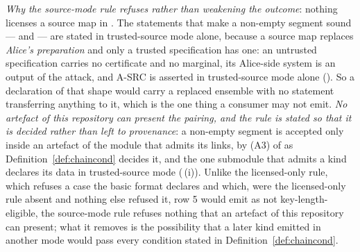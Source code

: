 \begin{remark}
\emph{Why the source-mode rule refuses rather than weakening the outcome}:
nothing licenses a source map in . The statements
that make a non-empty segment sound ---  and
 --- are stated in trusted-source mode
alone, because a source map replaces \emph{Alice's preparation} and only a
trusted specification has one: an untrusted specification carries no
certificate and no marginal, its Alice-side system is an output of the attack,
and A-SRC is asserted in trusted-source mode alone
(). So a declaration of that shape would carry a
replaced ensemble with no statement transferring anything to it, which is the
one thing a consumer may not emit. \emph{No artefact of this repository can
present the pairing, and the rule is stated so that it is decided rather than
left to provenance}: a non-empty segment is accepted only inside an artefact
of the module that admits its links, by (A3) of
 as Definition~\ref{def:chaincond}
decides it, and the one submodule that admits a kind
declares its data in trusted-source mode
(\,(i)). Unlike the licensed-only
rule, which refuses a case the basic format declares and which, were the
licensed-only rule absent and nothing else refused it, row 5 would emit as not
key-length-eligible, the source-mode rule
refuses nothing that an artefact of this repository can present; what it
removes is the possibility that a later kind emitted in another mode would
pass every condition stated in Definition~\ref{def:chaincond}.
\end{remark}
